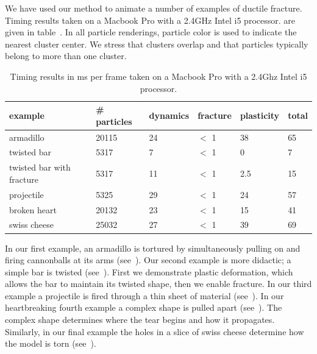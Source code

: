 \documentclass[review]{acmsiggraph}
\begin{document}
We have used our method to animate a number of examples of ductile fracture.  Timing results
taken on a Macbook Pro with a 2.4GHz Intel i5 processor.
are given in table~.
In all particle renderings, particle color is used to indicate the nearest cluster center.  
We stress that clusters overlap and that particles typically belong to more than one cluster.

\begin{table}
\begin{center}
\caption{Timing results in ms per frame taken on a Macbook Pro with a 2.4Ghz Intel i5 processor.}
\label{table:timing}
\begin{tabular}{|l|l|l|l|l|l|}
\hline
example & \# particles & dynamics & fracture & plasticity & total\\
\hline
armadillo & 20115 & 24  & $<$ 1 & 38 & 65\\
twisted bar & 5317 & 7 & $<$ 1  & 0 & 7\\
twisted bar with fracture & 5317 & 11  & $<$ 1 & 2.5 & 15 \\
projectile & 5325 & 29 & $<$ 1 & 24 & 57\\
broken heart & 20132 & 23 & $<$ 1 & 15 & 41\\
swiss cheese & 25032 & 27 & $<$ 1 & 39 & 69 \\
\hline
\end{tabular}
\end{center}
\end{table}

In our first example, an armadillo is tortured by simultaneously pulling on and firing
cannonballs at its arms (see~).
Our second example is more didactic; a simple bar is twisted (see~).  First we demonstrate 
plastic deformation, which allows the bar to maintain its twisted shape, then we enable fracture. 
In our third example a projectile is fired through a thin sheet of material (see~).  
In our heartbreaking fourth example a complex shape is pulled apart (see~).  The complex shape determines
where the tear begins and how it propagates.  Similarly, in our final example the holes in a 
slice of swiss cheese determine how the model is torn (see~).


\end{document}
